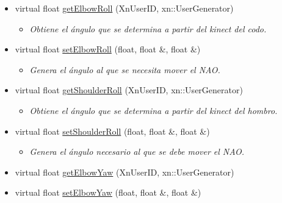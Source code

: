 \begin{itemize}
\item 
virtual float \hyperlink{class_r_arm_a5c91fecc7fea6e246ce87aac487bde4f}{get\-Elbow\-Roll} (\-Xn\-User\-I\-D, xn\-::\-User\-Generator)
\begin{itemize}\small\item\em \-Obtiene el ángulo que se determina a partir del kinect del codo. \end{itemize}\item 
\hypertarget{class_r_arm_a4788e34770371ab502e1a0d35ec41231}{virtual float \hyperlink{class_r_arm_a4788e34770371ab502e1a0d35ec41231}{set\-Elbow\-Roll} (float, float \&, float \&)}\label{class_r_arm_a4788e34770371ab502e1a0d35ec41231}

\begin{itemize}\small\item\em \-Genera el ángulo al que se necesita mover el \-N\-A\-O. \end{itemize}\item 
\hypertarget{class_r_arm_a273b56a909d68b769dc1ee4aab39fa55}{virtual float \hyperlink{class_r_arm_a273b56a909d68b769dc1ee4aab39fa55}{get\-Shoulder\-Roll} (\-Xn\-User\-I\-D, xn\-::\-User\-Generator)}\label{class_r_arm_a273b56a909d68b769dc1ee4aab39fa55}

\begin{itemize}\small\item\em \-Obtiene el ángulo que se determina a partir del kinect del hombro. \end{itemize}\item 
\hypertarget{class_r_arm_aef1de77829d8fe536eed27639408771b}{virtual float \hyperlink{class_r_arm_aef1de77829d8fe536eed27639408771b}{set\-Shoulder\-Roll} (float, float \&, float \&)}\label{class_r_arm_aef1de77829d8fe536eed27639408771b}

\begin{itemize}\small\item\em \-Genera el ángulo necesario al que se debe mover el \-N\-A\-O. \end{itemize}\item
\hypertarget{class_r_arm_a2647e80238d7767765777fae35ec92bb}{virtual float \hyperlink{class_r_arm_a2647e80238d7767765777fae35ec92bb}{get\-Elbow\-Yaw} (\-Xn\-User\-I\-D, xn\-::\-User\-Generator)}\label{class_r_arm_a2647e80238d7767765777fae35ec92bb}

\item 
\hypertarget{class_r_arm_a72b8946ae53bc1697bdd8371468334ba}{virtual float \hyperlink{class_r_arm_a72b8946ae53bc1697bdd8371468334ba}{set\-Elbow\-Yaw} (float, float \&, float \&)}\label{class_r_arm_a72b8946ae53bc1697bdd8371468334ba}

\end{itemize}

